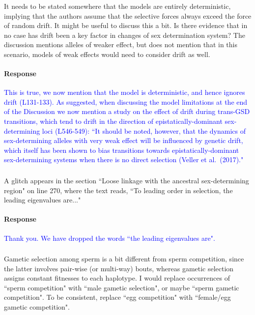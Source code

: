 \documentclass[10pt,letterpaper]{article}
\begin{document}
\noindent\subsubsection{}
It needs to be stated somewhere that the models are entirely deterministic, implying that the authors assume that the selective forces always exceed the force of random drift. It might be useful to discuss this a bit. Is there evidence that in no case has drift been a key factor in changes of sex determination system?  The discussion mentions alleles of weaker effect, but does not mention that in this scenario, models of weak effects would need to consider drift as well.

\noindent\paragraph{Response}
\textcolor{blue}{
This is true, we now mention that the model is deterministic, and hence ignores drift (L131-133). 
As suggested, when discussing the model limitations at the end of the Discussion we now mention a study on the effect of drift during trans-GSD transitions, which tend to drift in the direction of epistatically-dominant sex-determining loci (L546-549): ``It should be noted, however, that the dynamics of sex-determining alleles with very weak effect will be influenced by genetic drift, which itself has been shown to bias transitions towards epistatically-dominant sex-determining systems when there is no direct selection (Veller et al.\ (2017)."}

\noindent\subsubsection{}
A glitch appears in the section ``Loose linkage with the ancestral sex-determining region" on line 270, where the text reads, ``To leading order in selection, the leading eigenvalues are..."

\noindent\paragraph{Response}
\textcolor{blue}{Thank you. We have dropped the words ``the leading eigenvalues are".}

\noindent\subsubsection{}
Gametic selection among sperm is a bit different from sperm competition, since the latter involves pair-wise (or multi-way) bouts, whereas gametic selection assigns constant fitnesses to each haplotype. I would replace occurrences of ``sperm competition" with ``male gametic selection", or maybe ``sperm gametic competition". To be consistent, replace ``egg competition" with ``female/egg gametic competition". 
\end{document}
